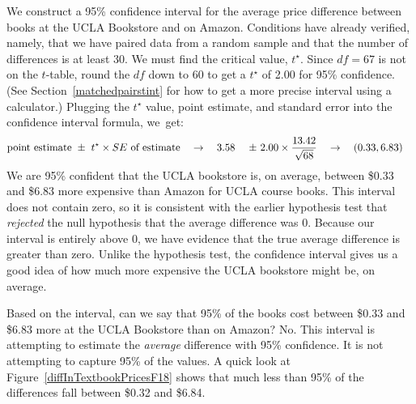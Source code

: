We construct a 95\% confidence interval for the average price difference between books at the UCLA Bookstore and on Amazon. Conditions have already verified, namely, that we have paired data from a random sample and that the number of differences is at least 30.  We must find the critical value, $t^{\star}$. Since $df = 67$ is not on the $t$-table, round the $df$ down to 60 to get a $t^{\star}$ of 2.00 for 95\% confidence. (See Section~\ref{matchedpairstint} for how to get a more precise interval using a calculator.)  Plugging the $t^{\star}$ value, point estimate, and standard error into the confidence interval formula, we~get:
\begin{align*}
\text{point estimate} \ &\pm\ t^{\star}\times SE\ \text{of estimate}
  \quad\to\quad
      \uclabookM{} \ &\pm\ 
          2.00 \times
          \frac{\uclabookSD{}}{\sqrt{\uclabookN{}}}
  \quad\to\quad
      (0.33&,  6.83)
\end{align*}
We are 95\% confident that the UCLA bookstore is, on average, between \$0.33 and \$6.83 more expensive than Amazon for UCLA course books. This interval does not contain zero, so it is consistent with the earlier hypothesis test that \emph{rejected} the null hypothesis that the average difference was 0. Because our interval is entirely above 0, we have evidence that the true average difference is greater than zero. Unlike the hypothesis test, the confidence interval gives us a good idea of how much more expensive the UCLA bookstore might be, on average.


\begin{examplewrap}
\begin{nexample}
{Based on the interval, can we say that 95\% of the books cost between \$0.33 and \$6.83 more at the UCLA Bookstore than on Amazon? }No.  This interval is attempting to estimate the \emph{average} difference with 95\% confidence.  It is not attempting to capture 95\% of the values.  A quick look at Figure~\ref{diffInTextbookPricesF18} shows that much less than 95\% of the differences fall between \$0.32 and \$6.84.


\end{nexample}
\end{examplewrap}


